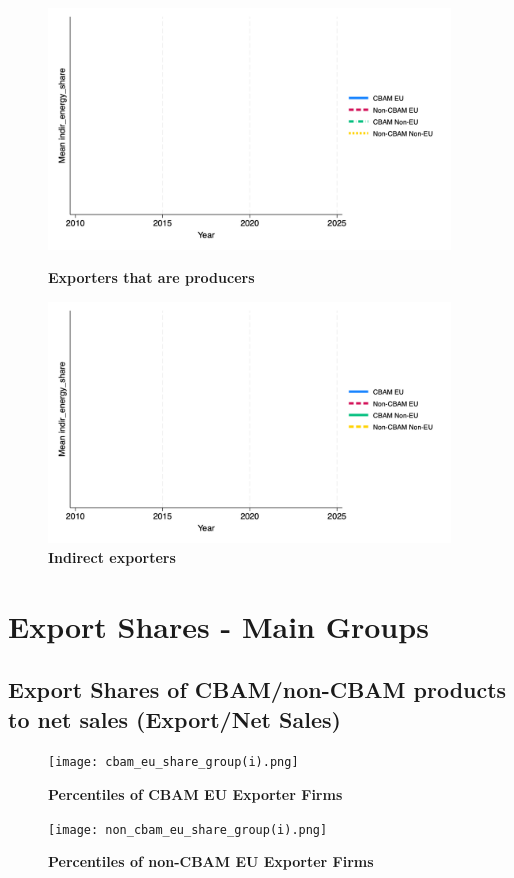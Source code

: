 \documentclass{article}
\begin{document}
\begin{figure}[H]
\centering
\includegraphics[width=0.95\textwidth]{indir_energy_share_ep.png}
\caption{\textbf{Exporters that are producers}}
\includegraphics[width=0.95\textwidth]{indir_energy_share_indir.png}
\caption{\textbf{Indirect exporters}}
\end{figure}

\section{Export Shares - Main Groups}
\subsection{Export Shares of CBAM/non-CBAM products to net sales (Export/Net Sales)}
\begin{figure}[H]
\centering
\texttt{[image: cbam\_eu\_share\_group(i).png]}
\caption{\textbf{Percentiles of CBAM EU Exporter Firms}}
\texttt{[image: non\_cbam\_eu\_share\_group(i).png]}
\caption{\textbf{Percentiles of non-CBAM EU Exporter Firms}}
\end{figure}
\end{document}
